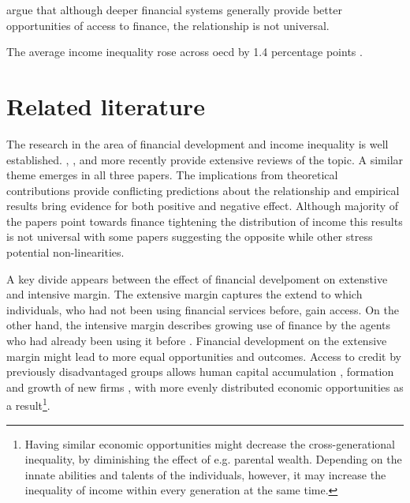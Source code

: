 \documentclass[a4paper,11pt]{article}
\begin{document}
\citet{claessens2007finance} argue that although deeper financial systems generally provide better opportunities of access to finance, the relationship is not universal.

The average income inequality rose across \ac{oecd} by 1.4 percentage points \citep{oecd2013crisis}.

\section{Related literature}
The research in the area of financial development and income inequality is well established. \citet{demirgucc2009finance}, \citet{claessens2007finance}, and more recently \cite{de2017finance} provide extensive reviews of the topic. A similar theme emerges in all three papers. The implications from theoretical contributions provide conflicting predictions about the relationship and empirical results bring evidence for both positive and negative effect. Although majority of the papers point towards finance tightening the distribution of income this results is not universal with some papers suggesting the opposite while other stress potential non-linearities.

A key divide appears between the effect of financial develpoment on extenstive and intensive margin. The extensive margin captures the extend to which individuals, who had not been using financial services before, gain access. On the other hand, the intensive margin describes growing use of finance by the agents who had already been using it before \citep{demirgucc2009finance}. Financial development on the extensive margin might lead to more equal opportunities and outcomes. Access to credit by previously disadvantaged groups allows human capital accumulation \citep{galorzeira1993income, galormoav2004, braunetal2019}, formation and growth of new firms \citep{evans1989estimated,banerjeenewman1990}, with more evenly distributed economic opportunities as a result\footnote{Having similar economic opportunities might decrease the cross-generational inequality, by diminishing the effect of e.g. parental wealth. Depending on the innate abilities and talents of the individuals, however, it may increase the inequality of income within every generation at the same time.}.
\end{document}
